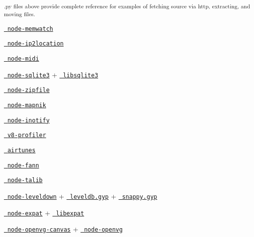 \begin{DoxyItemize}
 \textsubscript{.py files above provide complete reference for examples of fetching source via http, extracting, and moving files.}
\item \href{https://github.com/lloyd/node-memwatch/blob/master/binding.gyp}{\texttt{ node-\/memwatch}}
\item \href{https://github.com/bolgovr/node-ip2location/blob/master/binding.gyp}{\texttt{ node-\/ip2location}}
\item \href{https://github.com/justinlatimer/node-midi/blob/master/binding.gyp}{\texttt{ node-\/midi}}
\item \href{https://github.com/developmentseed/node-sqlite3/blob/master/binding.gyp}{\texttt{ node-\/sqlite3}} + \href{https://github.com/developmentseed/node-sqlite3/blob/master/deps/sqlite3.gyp}{\texttt{ libsqlite3}}
\item \href{https://github.com/mapbox/node-zipfile/blob/master/binding.gyp}{\texttt{ node-\/zipfile}}
\item \href{https://github.com/mapnik/node-mapnik/blob/master/binding.gyp}{\texttt{ node-\/mapnik}}
\item \href{https://github.com/c4milo/node-inotify/blob/master/binding.gyp}{\texttt{ node-\/inotify}}
\item \href{https://github.com/c4milo/v8-profiler/blob/master/binding.gyp}{\texttt{ v8-\/profiler}}
\item \href{https://github.com/radioline/node_airtunes/blob/master/binding.gyp}{\texttt{ airtunes}}
\item \href{https://github.com/c4milo/node-fann/blob/master/binding.gyp}{\texttt{ node-\/fann}}
\item \href{https://github.com/oransel/node-talib/blob/master/binding.gyp}{\texttt{ node-\/talib}}
\item \href{https://github.com/rvagg/node-leveldown/blob/master/binding.gyp}{\texttt{ node-\/leveldown}} + \href{https://github.com/rvagg/node-leveldown/blob/master/deps/leveldb/leveldb.gyp}{\texttt{ leveldb.\+gyp}} + \href{https://github.com/rvagg/node-leveldown/blob/master/deps/snappy/snappy.gyp}{\texttt{ snappy.\+gyp}}
\item \href{https://github.com/astro/node-expat/blob/master/binding.gyp}{\texttt{ node-\/expat}} + \href{https://github.com/astro/node-expat/blob/master/deps/libexpat/libexpat.gyp}{\texttt{ libexpat}}
\item \href{https://github.com/luismreis/node-openvg-canvas/blob/master/binding.gyp}{\texttt{ node-\/openvg-\/canvas}} + \href{https://github.com/luismreis/node-openvg/blob/master/binding.gyp}{\texttt{ node-\/openvg}}

\end{DoxyItemize}

